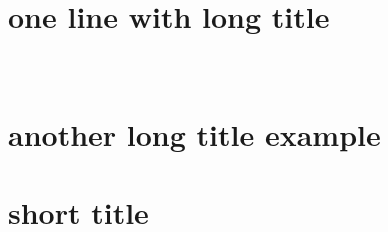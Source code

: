 
\setcounter{page}{1}
\mainmatter

\part[one line with long title]{one line with long title} %

\part{\\another long title example} %


\part{short title} %









































